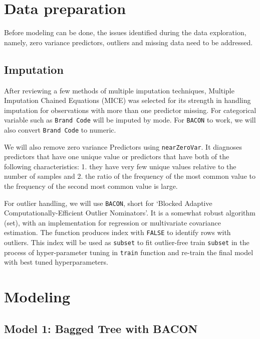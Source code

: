 \documentclass[]{report}
\begin{document}
\chapter{Data preparation}\label{data-preparation}

Before modeling can be done, the issues identified during the data
exploration, namely, zero variance predictors, outliers and missing data
need to be addressed.

\section{Imputation}\label{imputation}

After reviewing a few methods of multiple imputation techniques,
Multiple Imputation Chained Equations (MICE) was selected for its
strength in handling imputation for observations with more than one
predictor missing. For categorical variable such as \texttt{Brand\ Code}
will be imputed by mode. For \texttt{BACON} to work, we will also
convert \texttt{Brand\ Code} to numeric.

We will also remove zero variance Predictors using \texttt{nearZeroVar}.
It diagnoses predictors that have one unique value or predictors that
have both of the following characteristics: 1. they have very few unique
values relative to the number of samples and 2. the ratio of the
frequency of the most common value to the frequency of the second most
common value is large.

For outlier handling, we will use \texttt{BACON}, short for `Blocked
Adaptive Computationally-Efficient Outlier Nominators'. It is a somewhat
robust algorithm (set), with an implementation for regression or
multivariate covariance estimation. The function produces index with
\texttt{FALSE} to identify rows with outliers. This index will be used
as \texttt{subset} to fit outlier-free train \texttt{subset} in the
process of hyper-parameter tuning in \texttt{train} function and
re-train the final model with best tuned hyperparameters.

\chapter{Modeling}\label{modeling}

\section{Model 1: Bagged Tree with
BACON}\label{model-1-bagged-tree-with-bacon}
\end{document}
